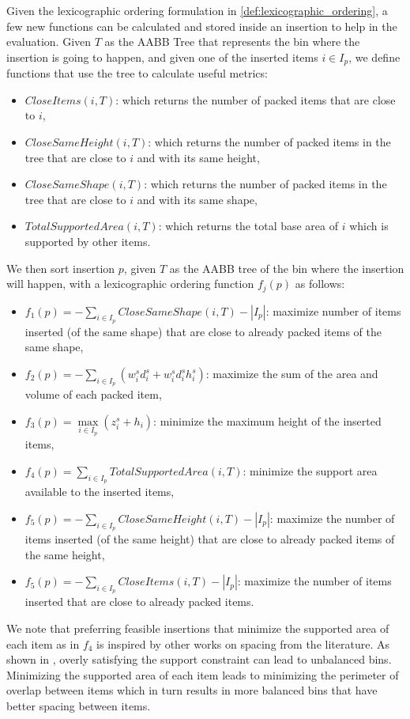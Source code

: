 Given the lexicographic ordering formulation in \cref{def:lexicographic_ordering}, a few new functions can be calculated and stored inside an insertion to help in the evaluation.
Given $T$ as the AABB Tree that represents the bin where the insertion is going to happen, and given one of the inserted items $i \in I_p$, we define functions that use the tree to calculate useful metrics:
\begin{itemize}
    \item $CloseItems(i, T)$: which returns the number of packed items that are close to $i$,
    \item $CloseSameHeight(i, T)$: which returns the number of packed items in the tree that are close to $i$ and with its same height,
    \item $CloseSameShape(i, T)$: which returns the number of packed items in the tree that are close to $i$ and with its same shape,
    \item $TotalSupportedArea(i, T)$: which returns the total base area of $i$ which is supported by other items.
\end{itemize}
We then sort insertion $p$, given $T$ as the AABB tree of the bin where the insertion will happen, with a lexicographic ordering function $f_j(p)$ as follows:
\begin{itemize}
    \item $f_1(p) = -\sum\limits_{i \in I_p}{CloseSameShape(i, T)} - |I_p|$: maximize number of items inserted (of the same shape) that are close to already packed items of the same shape,
    \item $f_2(p) = -\sum\limits_{i \in I_p}{(w^s_i d^s_i + w^s_i d^s_i h^s_i)}$: maximize the sum of the area and volume of each packed item,
    \item $f_3(p) = \max\limits_{i \in I_p}(z^s_i + h_i)$: minimize the maximum height of the inserted items,
    \item $f_4(p) = \sum\limits_{i \in I_p}{TotalSupportedArea(i, T)}$: minimize the support area available to the inserted items,
    \item $f_5(p) = -\sum\limits_{i \in I_p}{CloseSameHeight(i, T)} - |I_p|$: maximize the number of items inserted (of the same height) that are close to already packed items of the same height,
    \item $f_5(p) = -\sum\limits_{i \in I_p}{CloseItems(i, T)} - |I_p|$: maximize the number of items inserted that are close to already packed items.
\end{itemize}
We note that preferring feasible insertions that minimize the supported area of each item as in $f_4$ is inspired by other works on spacing from the literature.
As shown in \cite{elhedhli2019three}, overly satisfying the support constraint can lead to unbalanced bins.
Minimizing the supported area of each item leads to minimizing the perimeter of overlap between items which in turn results in more balanced bins that have better spacing between items.
